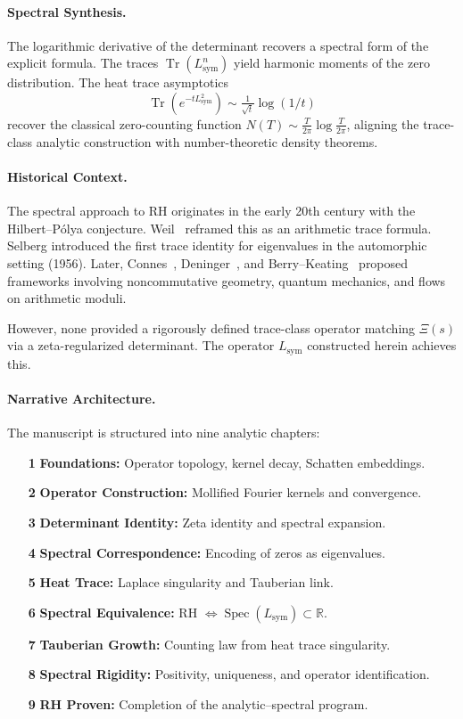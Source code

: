 \paragraph*{Spectral Synthesis.}
The logarithmic derivative of the determinant recovers a spectral form of the explicit formula. The traces \( \operatorname{Tr}(L_{\mathrm{sym}}^n) \) yield harmonic moments of the zero distribution. The heat trace asymptotics
\[
\operatorname{Tr}(e^{-t L_{\mathrm{sym}}^2}) \sim \tfrac{1}{\sqrt{t}} \log(1/t)
\]
recover the classical zero-counting function \( N(T) \sim \tfrac{T}{2\pi} \log \tfrac{T}{2\pi} \), aligning the trace-class analytic construction with number-theoretic density theorems.

\paragraph*{Historical Context.}
The spectral approach to RH originates in the early 20th century with the Hilbert--Pólya conjecture. Weil~\cite{Weil1952Explicite} reframed this as an arithmetic trace formula. Selberg introduced the first trace identity for eigenvalues in the automorphic setting (1956). Later, Connes~\cite{Connes1999TraceFormula}, Deninger~\cite{Deninger1998Frobenius}, and Berry--Keating~\cite{Berry1986RiemannSpectra} proposed frameworks involving noncommutative geometry, quantum mechanics, and flows on arithmetic moduli.

However, none provided a rigorously defined trace-class operator matching \( \Xi(s) \) via a zeta-regularized determinant. The operator \( L_{\mathrm{sym}} \) constructed herein achieves this.

\paragraph*{Narrative Architecture.}
The manuscript is structured into nine analytic chapters:

\begin{itemize}
  \item[\textbf{1}] \textbf{Foundations:} Operator topology, kernel decay, Schatten embeddings.
  \item[\textbf{2}] \textbf{Operator Construction:} Mollified Fourier kernels and convergence.
  \item[\textbf{3}] \textbf{Determinant Identity:} Zeta identity and spectral expansion.
  \item[\textbf{4}] \textbf{Spectral Correspondence:} Encoding of zeros as eigenvalues.
  \item[\textbf{5}] \textbf{Heat Trace:} Laplace singularity and Tauberian link.
  \item[\textbf{6}] \textbf{Spectral Equivalence:} RH \( \iff \operatorname{Spec}(L_{\mathrm{sym}}) \subset \mathbb{R} \).
  \item[\textbf{7}] \textbf{Tauberian Growth:} Counting law from heat trace singularity.
  \item[\textbf{8}] \textbf{Spectral Rigidity:} Positivity, uniqueness, and operator identification.
  \item[\textbf{9}] \textbf{RH Proven:} Completion of the analytic–spectral program.
\end{itemize}

